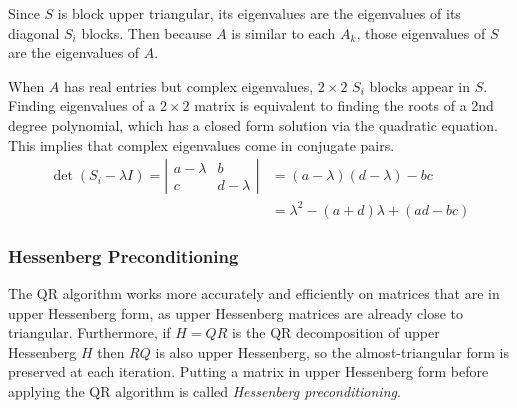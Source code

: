 Since $S$ is block upper triangular, its eigenvalues are the eigenvalues of its diagonal $S_i$ blocks.
Then because $A$ is similar to each $A_k$, those eigenvalues of $S$ are the eigenvalues of $A$.


When $A$ has real entries but complex eigenvalues, $2 \times 2$ $S_i$ blocks appear in $S$.
Finding eigenvalues of a $2 \times 2$ matrix is equivalent to finding the roots of a 2nd degree polynomial, which has a closed form solution via the quadratic equation.
This implies that complex eigenvalues come in conjugate pairs.
\begin{align}
\nonumber \det(S_i - \lambda I) =
\left|\begin{array}{cc}
a - \lambda & b           \\
c           & d - \lambda
\end{array}\right|
&= (a - \lambda)(d - \lambda) - bc \\
&= \lambda^2 - (a+d)\lambda + (ad - bc) \label{eq:qr-algorithm-roots}
\end{align}

\subsubsection*{Hessenberg Preconditioning} %

The QR algorithm works more accurately and efficiently on matrices that are in upper Hessenberg form, as upper Hessenberg matrices are already close to triangular.
Furthermore, if $H = QR$ is the QR decomposition of upper Hessenberg $H$ then $RQ$ is also upper Hessenberg, so the almost-triangular form is preserved at each iteration.
Putting a matrix in upper Hessenberg form before applying the QR algorithm is called \emph{Hessenberg preconditioning}.


